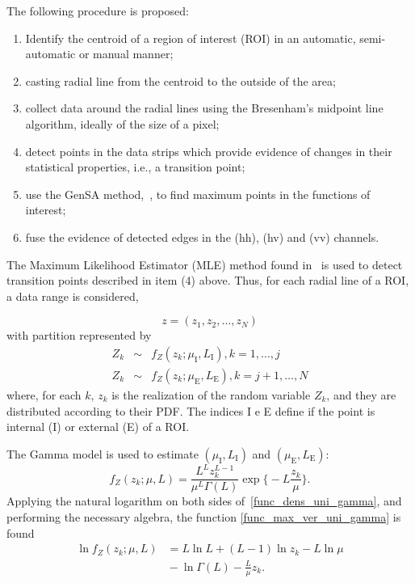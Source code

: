 \documentclass[journal]{IEEEtran}
\begin{document}
The following procedure is proposed:
\begin{enumerate}
	\item Identify the centroid of a region of interest (ROI) in an automatic, semi-automatic or manual manner;
	\item casting radial line from the centroid to the outside of the area;
	\item collect data around the radial lines using the  Bresenham's midpoint line algorithm, ideally of the size of a pixel;
	\item detect points in the data strips which provide evidence of changes in their statistical properties, i.e., a transition point;
	\item use the GenSA method,~\cite{xgsh}, to find maximum points in the functions of interest;
	\item fuse the evidence of detected edges in the (hh), (hv) and (vv) channels.
\end{enumerate}

The Maximum Likelihood Estimator (MLE) method found in~\cite{gmbf, nhfc} is used to detect transition points described in item (4) above. Thus, for each radial line of a ROI, a data range is considered,

\begin{equation}\nonumber
	z = (z_1,z_2,\dots,z_N)
\end{equation}
with partition represented by
\begin{equation}\label{func_max_ver_uni_gamma} 
\begin{array}{lll}
	Z_k&\sim& f_Z(z_k;\mu_\text{I},L_\text{I}), k=1,\dots,j\\
	Z_k&\sim& f_Z(z_k;\mu_\text{E},L_\text{E}), k=j+1,\dots,N
\end{array}
\end{equation}
where, for each $k$, $z_k$ is the realization of the random variable $Z_k$, and they are distributed according to their PDF. The indices I e E define if the point is internal (I) or external (E) of a ROI.

The Gamma model is used to estimate $(\mu_\text{I},L_\text{I})$ and $(\mu_\text{E},L_\text{E})$:
\begin{equation}\label{func_dens_uni_gamma}
	f_Z(z_k;\mu,L)=\frac{L^{L}z_k^{L-1}}{\mu^{L}\Gamma(L)} \exp\Big\{-L\frac{z_k}{\mu}\Big\}.
\end{equation}
Applying the natural logarithm on both sides of~\eqref{func_dens_uni_gamma}, and performing  the necessary algebra,  the function \eqref{func_max_ver_uni_gamma} is found
\begin{equation}\label{func_max_ver_uni_gamma}
\begin{split}
	\ln f_Z(z_k;\mu,L)&= L\ln L +(L - 1) \ln z_k-L \ln \mu \\
	 	                  &{}- \ln \Gamma(L) -\frac{L}{\mu} z_k.\\
\end{split}
\end{equation}
\end{document}
